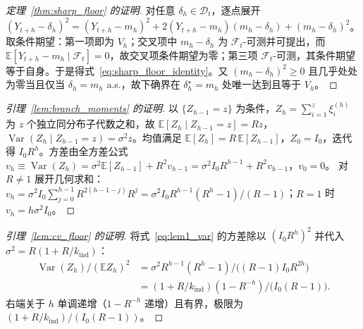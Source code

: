 \documentclass[10pt,UTF8,a4paper,zihao=-4]{ctexart}
\theoremstyle{plain}
\theoremstyle{definition}
\theoremstyle{remark}
\begin{document}
\renewcommand{\thetheorem}{A\arabic{theorem}}
\setcounter{theorem}{0}

\begin{proof}[定理~\ref{thm:sharp_floor} 的证明]
对任意 $\delta_h \in \mathcal{D}_t$，逐点展开
$(Y_{t+h}-\delta_h)^2 = (Y_{t+h}-m_h)^2 + 2(Y_{t+h}-m_h)(m_h-\delta_h) + (m_h-\delta_h)^2$。
取条件期望：第一项即为 $V_h$；交叉项中 $m_h - \delta_h$ 为 $\mathcal{F}_t$-可测并可提出，而 $\mathbb{E}[Y_{t+h}-m_h \mid \mathcal{F}_t] = 0$，故交叉项条件期望为零；第三项 $\mathcal{F}_t$-可测，其条件期望等于自身。于是得式~\eqref{eq:sharp_floor_identity}。又 $(m_h-\delta_h)^2 \ge 0$ 且几乎处处为零当且仅当 $\delta_h = m_h$ a.s.，故下确界在 $\delta_h^\star = m_h$ 处唯一达到且等于 $V_h$。
\end{proof}

\begin{proof}[引理~\ref{lem:branch_moments} 的证明]
以 $\{Z_{h-1}=z\}$ 为条件，$Z_h = \sum_{i=1}^{z}\xi_i^{(h)}$ 为 $z$ 个独立同分布子代数之和，故 $\mathbb{E}[Z_h \mid Z_{h-1}=z] = Rz$，$\operatorname{Var}(Z_h \mid Z_{h-1}=z) = \sigma^2 z$。均值满足 $\mathbb{E}[Z_h] = R\,\mathbb{E}[Z_{h-1}]$，$Z_0=I_0$，迭代得 $I_0 R^h$。方差由全方差公式
$v_h \equiv \operatorname{Var}(Z_h) = \sigma^2 \mathbb{E}[Z_{h-1}] + R^2 v_{h-1} = \sigma^2 I_0 R^{h-1} + R^2 v_{h-1}$，$v_0 = 0$。
对 $R \ne 1$ 展开几何求和：$v_h = \sigma^2 I_0 \sum_{j=0}^{h-1} R^{2(h-1-j)} R^{j} = \sigma^2 I_0 R^{h-1} (R^h - 1)/(R-1)$；$R=1$ 时 $v_h = h \sigma^2 I_0$。
\end{proof}

\begin{proof}[引理~\ref{lem:cv_floor} 的证明]
将式~\eqref{eq:lem1_var} 的方差除以 $(I_0 R^h)^2$ 并代入 $\sigma^2 = R(1+R/k_{\text{ind}})$：
\begin{align*}
\operatorname{Var}(Z_h)/(\mathbb{E}Z_h)^2 &= \sigma^2 R^{h-1}(R^h-1)\big/\bigl((R-1)I_0 R^{2h}\bigr) \\
&= (1+R/k_{\text{ind}})(1-R^{-h})\big/\bigl(I_0(R-1)\bigr).
\end{align*}
右端关于 $h$ 单调递增（$1 - R^{-h}$ 递增）且有界，极限为 $(1+R/k_{\text{ind}})/(I_0(R-1))$。
\end{proof}
\end{document}
